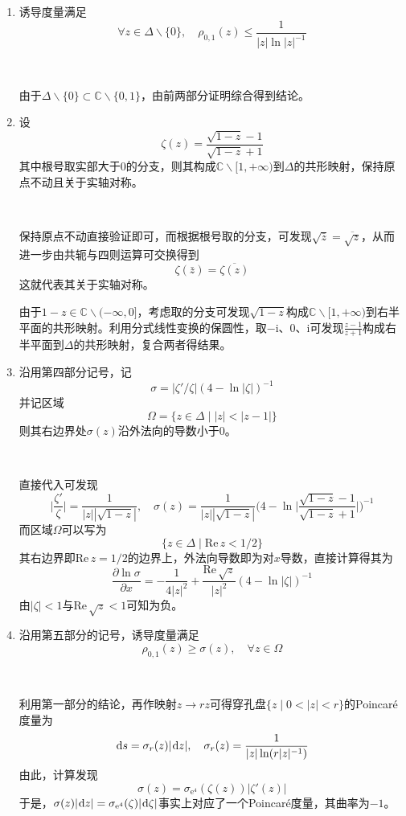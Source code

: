 \documentclass[a4paper,UTF8,fontset=windows,10pt]{ctexart}
\newcommand*{\er}{\mathrm{e}}
\newcommand*{\ir}{\mathrm{i}}
\newcommand*{\dr}{\hspace{0.07em}\mathrm{d}}
\newcommand*{\re}{\mathrm{Re}\,}
\begin{document}
\begin{enumerate}
\begin{enumerate}
\begin{enumerate}
            \item 诱导度量满足
            $$\forall z\in\Delta\backslash\{0\},\quad\rho_{0,1}(z)\le\frac{1}{|z|\ln|z|^{-1}}$$
            
            \

            由于$\Delta\backslash\{0\}\subset\mathbb{C}\backslash\{0,1\}$，由前两部分证明综合得到结论。


            \item 设
            $$\zeta(z)=\frac{\sqrt{1-z}-1}{\sqrt{1-z}+1}$$
            其中根号取实部大于0的分支，则其构成$\mathbb{C}\backslash[1,+\infty)$到$\Delta$的共形映射，保持原点不动且关于实轴对称。
            
            \

            保持原点不动直接验证即可，而根据根号取的分支，可发现$\sqrt{\bar{z}}=\overline{\sqrt{z}}$，从而进一步由共轭与四则运算可交换得到
            $$\zeta(\bar{z})=\overline{\zeta(z)}$$
            这就代表其关于实轴对称。

            由于$1-z\in\mathbb{C}\backslash(-\infty,0]$，考虑取的分支可发现$\sqrt{1-z}$构成$\mathbb{C}\backslash[1,+\infty)$到右半平面的共形映射。利用分式线性变换的保圆性，取$-\ir$、0、$\ir$可发现$\frac{z-1}{z+1}$构成右半平面到$\Delta$的共形映射，复合两者得结果。

            \item 沿用第四部分记号，记
            $$\sigma=|\zeta'/\zeta|(4-\ln|\zeta|)^{-1}$$
            并记区域
            $$\Omega=\{z\in\Delta\mid|z|<|z-1|\}$$
            则其右边界处$\sigma(z)$沿外法向的导数小于0。

            \

            直接代入可发现
            $$\bigg|\frac{\zeta'}{\zeta}\bigg|=\frac{1}{|z||\sqrt{1-z}|},\quad\sigma(z)=\frac{1}{|z||\sqrt{1-z}|}\bigg(4-\ln\bigg|\frac{\sqrt{1-z}-1}{\sqrt{1-z}+1}\bigg|\bigg)^{-1}$$
            而区域$\Omega$可以写为
            $$\{z\in\Delta\mid\re z<1/2\}$$
            其右边界即$\re z=1/2$的边界上，外法向导数即为对$x$导数，直接计算得其为
            $$\frac{\partial\ln\sigma}{\partial x}=-\frac{1}{4|z|^2}+\frac{\re\sqrt{z}}{|z|^2}(4-\ln|\zeta|)^{-1}$$
            由$|\zeta|<1$与$\re\sqrt{z}<1$可知为负。

            \item 沿用第五部分的记号，诱导度量满足
            $$\rho_{0,1}(z)\ge\sigma(z),\quad\forall z\in\Omega$$

            \

            利用第一部分的结论，再作映射$z\to rz$可得穿孔盘$\{z\mid0<|z|<r\}$的Poincar\'e度量为
            $$\dr s=\sigma_r(z)|\dr z|,\quad\sigma_r(z)=\frac{1}{|z|\ln(r|z|^{-1})}$$
            由此，计算发现
            $$\sigma(z)=\sigma_{\er^4}(\zeta(z))|\zeta'(z)|$$
            于是，$\sigma(z)|\dr z|=\sigma_{\er^4}(\zeta)|\dr\zeta|$事实上对应了一个Poincar\'e度量，其曲率为$-1$。
            

\end{enumerate}
\end{enumerate}
\end{enumerate}
\end{document}
